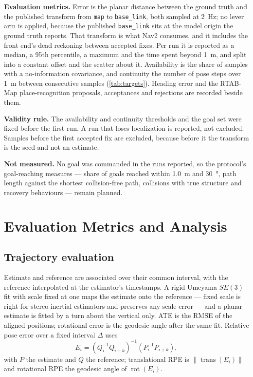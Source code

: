 \textbf{Evaluation metrics.} Error is the planar distance between the ground
truth and the published transform from \texttt{map} to \texttt{base\_link}, both
sampled at \SI{2}{\hertz}; no lever arm is applied, because the published
\texttt{base\_link} sits at the model origin the ground truth reports. That
transform is what Nav2 consumes, and it includes the front end's dead
reckoning between accepted fixes. Per run it is reported as a median, a 95th percentile, a
maximum and the time spent beyond \SI{1}{\metre}, and split into a constant
offset and the scatter about it. Availability is the share of samples with a
no-information covariance, and continuity the number of pose steps over
\SI{1}{\metre} between consecutive samples (\cref{tab:targets}). Heading error
and the RTAB-Map place-recognition proposals, acceptances and rejections are
recorded beside them.

\textbf{Validity rule.} The availability and continuity thresholds and the goal
set were fixed before the first run. A run
that loses localization is reported, not excluded. Samples before the first
accepted fix are excluded, because before it the transform is the seed and not
an estimate.

\textbf{Not measured.} No goal was commanded in the runs reported, so the
protocol's goal-reaching measures --- share of goals reached within
\SI{1.0}{\metre} and \SI{30}{\degree}, path length against the shortest
collision-free path, collisions with true structure and recovery behaviours ---
remain planned.

\section{Evaluation Metrics and Analysis}
\label{sec:evaluation-method}

\subsection{Trajectory evaluation}
\label{sec:method-trajectory}
Estimate and reference are associated over their common interval, with the
reference interpolated at the estimator's timestamps. A rigid Umeyama $SE(3)$
fit with scale fixed at one maps the estimate onto the reference --- fixed scale
is right for stereo-inertial estimators and preserves any scale error --- and a
planar estimate is fitted by a turn about the vertical only. ATE is the RMSE of
the aligned positions; rotational error is the geodesic angle after the same
fit. Relative pose error over a fixed interval $\Delta$ uses
\begin{equation}
  E_i = \left(Q_i^{-1}Q_{i+k}\right)^{-1}\left(P_i^{-1}P_{i+k}\right),
  \label{eq:rpe}
\end{equation}
with $P$ the estimate and $Q$ the reference; translational RPE is
$\lVert\operatorname{trans}(E_i)\rVert$ and rotational RPE the geodesic angle
of $\operatorname{rot}(E_i)$.

